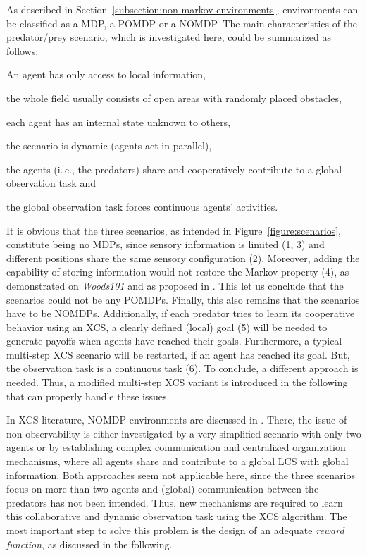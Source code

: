 As described in Section~\ref{subsection:non-markov-environments}, environments can be classified as a MDP, a POMDP or a NOMDP. The main characteristics of the predator/prey scenario, which is investigated here, could be summarized as follows:

\begin{enumerate*}
	\item An agent has only access to local information,
	\item the whole field usually consists of open areas with randomly placed obstacles,
	\item each agent has an internal state unknown to others,
	\item the scenario is dynamic (agents act in parallel),
	\item the agents (i.\,e., the predators) share and cooperatively contribute to a glo\-bal observation task and
	\item the global observation task forces continuous agents' activities.  
\end{enumerate*}

It is obvious that the three scenarios, as intended in Figure~\ref{figure:scenarios}, constitute being no MDPs, since sensory information is limited (1, 3) and different positions share the same sensory configuration (2). Moreover, adding the capability of storing information 
would not restore the Markov property (4), as demonstrated on \emph{Woods101} and as proposed in \cite{Lan98,LW00}. This let us conclude that the scenarios could not be any POMDPs. Finally, this also remains that the scenarios have to be NOMDPs. Additionally, if each predator tries to learn its cooperative behavior using an XCS, a clearly defined (local) goal (5) will be needed to generate payoffs when agents have reached their goals. Furthermore, a typical multi-step XCS scenario will be restarted, if an agent has reached its goal. But, the observation task is a continuous task (6). %
To conclude, a different approach is needed. Thus, a modified multi-step XCS variant is introduced in the following that can properly handle these issues.

In XCS literature, NOMDP environments are discussed in \cite{Miyazaki2,TTS01}. There, the issue of non-observability is either investigated by a very simplified scenario with only two agents or by establishing complex communication and centralized organization mechanisms, where all agents share and contribute to a global LCS with global information. Both approaches seem not applicable here, since the three scenarios focus on more than two agents and (global) communication between the predators has not been intended. Thus, new mechanisms are required to learn this %
collaborative and dynamic observation task using the XCS algorithm. The most important step to solve this problem is the design of an adequate \emph{reward function}, as discussed in the following. %

